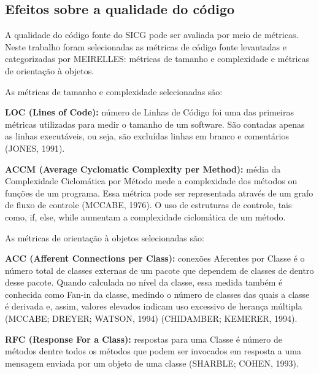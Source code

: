 \subsection[Efeitos sobre a qualidade do código]{Efeitos sobre a qualidade do código}

A qualidade do código fonte do SICG pode ser avaliada por meio de métricas. Neste trabalho foram selecionadas as métricas de código fonte levantadas e categorizadas por MEIRELLES: métricas de tamanho e complexidade e métricas de orientação à objetos. 

As métricas de tamanho e complexidade selecionadas são: 

\textbf{LOC (Lines of Code):} número de Linhas de Código foi uma das primeiras métricas
utilizadas para medir o tamanho de um software. São contadas apenas as linhas
executáveis, ou seja, são excluídas linhas em branco e comentários (JONES,
1991).

 \vspace{\onelineskip} 

\textbf{ACCM (Average Cyclomatic Complexity per Method):} média da Complexidade
Ciclomática por Método mede a complexidade dos métodos ou funções
de um programa. Essa métrica pode ser representada através de um grafo de fluxo
de controle (MCCABE, 1976). O uso de estruturas de controle, tais como, if, else,
while aumentam a complexidade ciclomática de um método.

 \vspace{\onelineskip} 

As métricas de orientação à objetos selecionadas são:

\textbf{ACC (Afferent Connections per Class):} conexões Aferentes por Classe é o número
total de classes externas de um pacote que dependem de classes de dentro desse
pacote. Quando calculada no nível da classe, essa medida também é conhecida como
Fan-in da classe, medindo o número de classes das quais a classe é derivada e, assim,
valores elevados indicam uso excessivo de herança múltipla (MCCABE; DREYER;
WATSON, 1994) (CHIDAMBER; KEMERER, 1994).

 \vspace{\onelineskip} 

\textbf{RFC (Response For a Class):} respostas para uma Classe é número de métodos
dentre todos os métodos que podem ser invocados em resposta a uma mensagem
enviada por um objeto de uma classe (SHARBLE; COHEN, 1993).

 \vspace{\onelineskip} 

